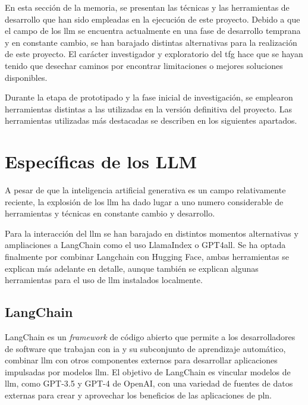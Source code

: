 
En esta sección de la memoria, se presentan las técnicas y las herramientas de desarrollo que han sido empleadas en la ejecución de este proyecto. Debido a que el campo de los \acrshort{llm} se encuentra actualmente en una fase de desarrollo temprana y en constante cambio, se han barajado distintas alternativas para la realización de este proyecto. El carácter investigador y exploratorio del tfg hace que se hayan tenido que desechar caminos por encontrar limitaciones o mejores soluciones disponibles.

Durante la etapa de prototipado y la fase inicial de investigación, se emplearon herramientas distintas a las utilizadas en la versión definitiva del proyecto. Las herramientas utilizadas más destacadas se describen en los siguientes apartados.

\section{Específicas de los LLM}

A pesar de que la inteligencia artificial generativa es un campo relativamente reciente, la explosión de los \acrshort{llm} ha dado lugar a uno numero considerable de herramientas y técnicas en constante cambio y desarrollo.

Para la interacción del \acrshort{llm} se han barajado en distintos momentos alternativas y ampliaciones a LangChain como el uso LlamaIndex o GPT4all. Se ha optada finalmente por combinar Langchain con Hugging Face, ambas herramientas se explican más adelante en detalle, aunque también se explican algunas herramientas para el uso de \acrshort{llm} instalados localmente.

\subsection{LangChain}

LangChain es un \textit{framework} de código abierto que permite a los desarrolladores de software que trabajan con \acrfull{ia} y su subconjunto de aprendizaje automático, combinar \acrlong{llm} con otros componentes externos para desarrollar aplicaciones impulsadas por modelos \acrshort{llm}. El objetivo de LangChain es vincular modelos de \acrshort{llm}, como GPT-3.5 y GPT-4 de OpenAI, con una variedad de fuentes de datos externas para crear y aprovechar los beneficios de las aplicaciones de \acrfull{pln}.

